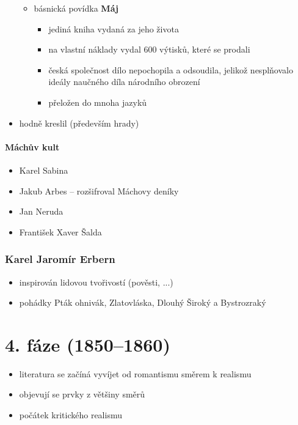 \begin{itemize}
\begin{itemize}
	\item básnická povídka \textbf{Máj}
		\begin{itemize}
		\item jediná kniha vydaná za jeho života
		\item na vlastní náklady vydal 600 výtisků, které se prodali
		\item česká společnost dílo nepochopila a odsoudila, jelikož nesplňovalo ideály naučného díla národního obrození
		\item přeložen do mnoha jazyků
		\end{itemize}
	\end{itemize}
\item hodně kreslil (především hrady)
\end{itemize}

\paragraph{Máchův kult}
\begin{itemize}
\item Karel Sabina
\item Jakub Arbes -- rozšifroval Máchovy deníky
\item Jan Neruda
\item František Xaver Šalda
\end{itemize}

\subsubsection{Karel Jaromír Erbern}
\begin{itemize}
\item inspirován lidovou tvořivostí (pověsti, ...)
\item pohádky Pták ohnivák, Zlatovláska, Dlouhý Široký a Bystrozraký
\end{itemize}




\section{4. fáze (1850--1860)}
\begin{itemize}
\item literatura se začíná vyvíjet od romantismu směrem k realismu
\item objevují se prvky z většiny směrů
\item počátek kritického realismu
\end{itemize}

